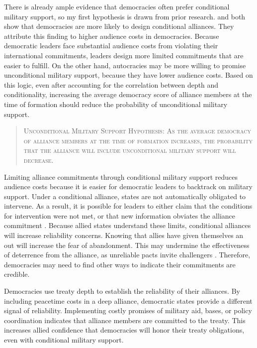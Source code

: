 \documentclass[12pt]{article}
\begin{document}
There is already ample evidence that democracies often prefer conditional military support, so my first hypothesis is drawn from prior research.  
\citet{Mattes2012} and \citet{Chibaetal2015} both show that democracies are more likely to design conditional alliances. 
They attribute this finding to higher audience costs in democracies. 
Because democratic leaders face substantial audience costs from violating their international commitments, leaders design more limited commitments that are easier to fulfill. 
On the other hand, autocracies may be more willing to promise unconditional military support, because they have lower audience costs. 
Based on this logic, even after accounting for the correlation between depth and conditionality, increasing the average democracy score of alliance members at the time of formation should reduce the probability of unconditional military support.


\begin{quote}
\textsc{Unconditional Military Support Hypothesis: As the average democracy of alliance members at the time of formation increases, the probability that the alliance will include unconditional military support will decrease.}
\end{quote} 


Limiting alliance commitments through conditional military support reduces audience costs because it is easier for democratic leaders to backtrack on military support. 
Under a conditional alliance, states are not automatically obligated to intervene. 
As a result, it is possible for leaders to either claim that the conditions for intervention were not met, or that new information obviates the alliance commitment \citep{LevenduskyHorowitz2012}. 
Because allied states understand these limits, conditional alliances will increase reliability concerns. 
Knowing that allies have given themselves an out will increase the fear of abandonment. 
This may undermine the effectiveness of deterrence from the alliance, as unreliable pacts invite challengers \citep{Smith1995}. 
Therefore, democracies may need to find other ways to indicate their commitments are credible. 


Democracies use treaty depth to establish the reliability of their alliances.  
By including peacetime costs in a deep alliance, democratic states provide a different signal of reliability. 
Implementing costly promises of military aid, bases, or policy coordination indicates that alliance members are committed to the treaty. 
This increases allied confidence that democracies will honor their treaty obligations, even with conditional military support. 
\end{document}
